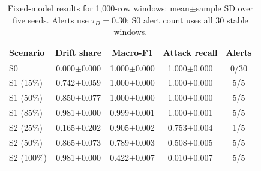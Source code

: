 \begin{table}[t]
\caption{Fixed-model results for 1,000-row windows: mean$\pm$sample SD over five seeds. Alerts use $\tau_D=0.30$; S0 alert count uses all 30 stable windows.}
\label{tab:results}
\centering
\small
\begin{tabular*}{\linewidth}{@{\extracolsep{\fill}}lcccc@{}}
\toprule
Scenario & Drift share & Macro-F1 & Attack recall & Alerts \\
\midrule
S0 & 0.000$\pm$0.000 & 1.000$\pm$0.000 & 1.000$\pm$0.000 & 0/30 \\
S1 (15\%) & 0.742$\pm$0.059 & 1.000$\pm$0.000 & 1.000$\pm$0.000 & 5/5 \\
S1 (50\%) & 0.850$\pm$0.077 & 1.000$\pm$0.000 & 1.000$\pm$0.000 & 5/5 \\
S1 (85\%) & 0.981$\pm$0.000 & 0.999$\pm$0.001 & 1.000$\pm$0.001 & 5/5 \\
S2 (25\%) & 0.165$\pm$0.202 & 0.905$\pm$0.002 & 0.753$\pm$0.004 & 1/5 \\
S2 (50\%) & 0.865$\pm$0.073 & 0.789$\pm$0.003 & 0.508$\pm$0.005 & 5/5 \\
S2 (100\%) & 0.981$\pm$0.000 & 0.422$\pm$0.007 & 0.010$\pm$0.007 & 5/5 \\
\bottomrule
\end{tabular*}
\end{table}
